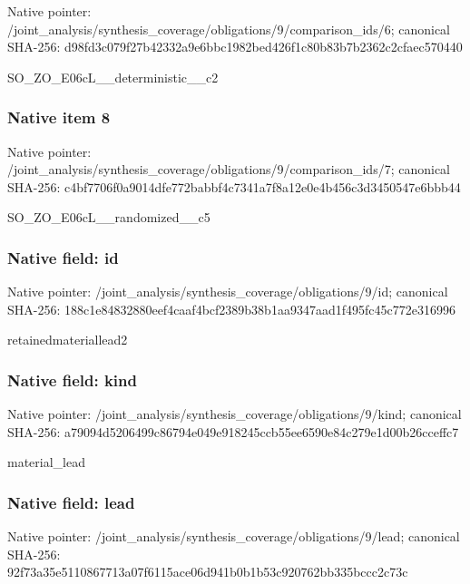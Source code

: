 \documentclass[10pt,a4paper]{article}
\begin{document}
Native pointer: /joint\_analysis/synthesi\allowbreak{}s\_coverage/obligations/9\allowbreak{}/comparison\_ids/6; canonical SHA-256: d98fd3c079f27b42332a9e6b\allowbreak{}bc1982bed426f1c80b83b7b2\allowbreak{}362c2cfaec570440


SO\_ZO\_E06cL\_\_deterministic\_\_c2


\subsubsection{Native item 8}


Native pointer: /joint\_analysis/synthesi\allowbreak{}s\_coverage/obligations/9\allowbreak{}/comparison\_ids/7; canonical SHA-256: c4bf7706f0a9014dfe772bab\allowbreak{}bf4c7341a7f8a12e0e4b456c\allowbreak{}3d3450547e6bbb44


SO\_ZO\_E06cL\_\_randomized\_\_c5


\subsubsection{Native field: id}


Native pointer: /joint\_analysis/synthesi\allowbreak{}s\_coverage/obligations/9\allowbreak{}/id; canonical SHA-256: 188c1e84832880eef4caaf4b\allowbreak{}cf2389b38b1aa9347aad1f49\allowbreak{}5fc45c772e316996


retainedmateriallead2


\subsubsection{Native field: kind}


Native pointer: /joint\_analysis/synthesi\allowbreak{}s\_coverage/obligations/9\allowbreak{}/kind; canonical SHA-256: a79094d5206499c86794e049\allowbreak{}e918245ccb55ee6590e84c27\allowbreak{}9e1d00b26cceffc7


material\_lead


\subsubsection{Native field: lead}


Native pointer: /joint\_analysis/synthesi\allowbreak{}s\_coverage/obligations/9\allowbreak{}/lead; canonical SHA-256: 92f73a35e5110867713a07f6\allowbreak{}115ace06d941b0b1b53c9207\allowbreak{}62bb335bccc2c73c
\end{document}
